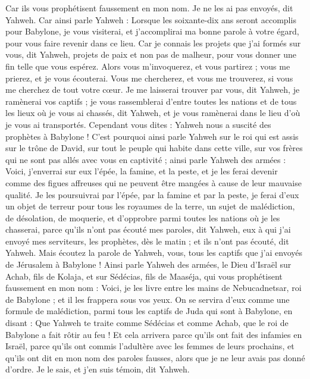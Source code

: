 \begin{multicols}{2}
Car ils vous prophétisent faussement en mon nom. Je ne les ai pas envoyés, dit Yahweh.
Car ainsi parle Yahweh : Lorsque les soixante-dix ans seront accomplis pour Babylone, je vous visiterai, et j'accomplirai ma bonne parole à votre égard, pour vous faire revenir dans ce lieu.
Car je connais les projets que j'ai formés sur vous, dit Yahweh, projets de paix et non pas de malheur, pour vous donner une fin telle que vous espérez.
Alors vous m'invoquerez, et vous partirez ; vous me prierez, et je vous écouterai.
Vous me chercherez, et vous me trouverez, si vous me cherchez de tout votre cœur.
Je me laisserai trouver par vous, dit Yahweh, je ramènerai vos captifs ; je vous rassemblerai d'entre toutes les nations et de tous les lieux où je vous ai chassés, dit Yahweh, et je vous ramènerai dans le lieu d'où je vous ai transportés.
Cependant vous dites : Yahweh nous a suscité des prophètes à Babylone !
C'est pourquoi ainsi parle Yahweh sur le roi qui est assis sur le trône de David, sur tout le peuple qui habite dans cette ville, sur vos frères qui ne sont pas allés avec vous en captivité ;
ainsi parle Yahweh des armées : Voici, j'enverrai sur eux l'épée, la famine, et la peste, et je les ferai devenir comme des figues affreuses qui ne peuvent être mangées à cause de leur mauvaise qualité.
Je les poursuivrai par l'épée, par la famine et par la peste, je ferai d'eux un objet de terreur pour tous les royaumes de la terre, un sujet de malédiction, de désolation, de moquerie, et d'opprobre parmi toutes les nations où je les chasserai,
parce qu'ils n'ont pas écouté mes paroles, dit Yahweh, eux à qui j'ai envoyé mes serviteurs, les prophètes, dès le matin ; et ils n'ont pas écouté, dit Yahweh.
Mais écoutez la parole de Yahweh, vous, tous les captifs que j'ai envoyés de Jérusalem à Babylone !
Ainsi parle Yahweh des armées, le Dieu d'Israël sur Achab, fils de Kolaja, et sur Sédécias, fils de Maaséja, qui vous prophétisent faussement en mon nom : Voici, je les livre entre les mains de Nebucadnetsar, roi de Babylone ; et il les frappera sous vos yeux.
On se servira d'eux comme une formule de malédiction, parmi tous les captifs de Juda qui sont à Babylone, en disant : Que Yahweh te traite comme Sédécias et comme Achab, que le roi de Babylone a fait rôtir au feu !
Et cela arrivera parce qu'ils ont fait des infamies en Israël, parce qu'ils ont commis l'adultère avec les femmes de leurs prochains, et qu'ils ont dit en mon nom des paroles fausses, alors que je ne leur avais pas donné d'ordre. Je le sais, et j'en suis témoin, dit Yahweh.

\end{multicols}
